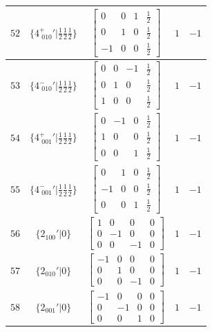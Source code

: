 \documentclass[fleqn,8pt]{jsarticle}
\begin{document}
\begin{longtable}{ccccc}
$ 52 $ & $ \{4^{+}_{\,\,010}{}'|\frac{1}{2} \frac{1}{2} \frac{1}{2}\} $ & $ \begin{bmatrix} 0 & 0 & 1 & \frac{1}{2} \\ 0 & 1 & 0 & \frac{1}{2} \\ -1 & 0 & 0 & \frac{1}{2} \end{bmatrix} $ & $ 1 $ & $ -1 $ \\ \hline
$ 53 $ & $ \{4^{-}_{\,\,010}{}'|\frac{1}{2} \frac{1}{2} \frac{1}{2}\} $ & $ \begin{bmatrix} 0 & 0 & -1 & \frac{1}{2} \\ 0 & 1 & 0 & \frac{1}{2} \\ 1 & 0 & 0 & \frac{1}{2} \end{bmatrix} $ & $ 1 $ & $ -1 $ \\ \hline
$ 54 $ & $ \{4^{+}_{\,\,001}{}'|\frac{1}{2} \frac{1}{2} \frac{1}{2}\} $ & $ \begin{bmatrix} 0 & -1 & 0 & \frac{1}{2} \\ 1 & 0 & 0 & \frac{1}{2} \\ 0 & 0 & 1 & \frac{1}{2} \end{bmatrix} $ & $ 1 $ & $ -1 $ \\ \hline
$ 55 $ & $ \{4^{-}_{\,\,001}{}'|\frac{1}{2} \frac{1}{2} \frac{1}{2}\} $ & $ \begin{bmatrix} 0 & 1 & 0 & \frac{1}{2} \\ -1 & 0 & 0 & \frac{1}{2} \\ 0 & 0 & 1 & \frac{1}{2} \end{bmatrix} $ & $ 1 $ & $ -1 $ \\ \hline
$ 56 $ & $ \{2{}_{100}{}'|0\} $ & $ \begin{bmatrix} 1 & 0 & 0 & 0 \\ 0 & -1 & 0 & 0 \\ 0 & 0 & -1 & 0 \end{bmatrix} $ & $ 1 $ & $ -1 $ \\ \hline
$ 57 $ & $ \{2{}_{010}{}'|0\} $ & $ \begin{bmatrix} -1 & 0 & 0 & 0 \\ 0 & 1 & 0 & 0 \\ 0 & 0 & -1 & 0 \end{bmatrix} $ & $ 1 $ & $ -1 $ \\ \hline
$ 58 $ & $ \{2{}_{001}{}'|0\} $ & $ \begin{bmatrix} -1 & 0 & 0 & 0 \\ 0 & -1 & 0 & 0 \\ 0 & 0 & 1 & 0 \end{bmatrix} $ & $ 1 $ & $ -1 $ \\ \hline

\end{longtable}
\end{document}
